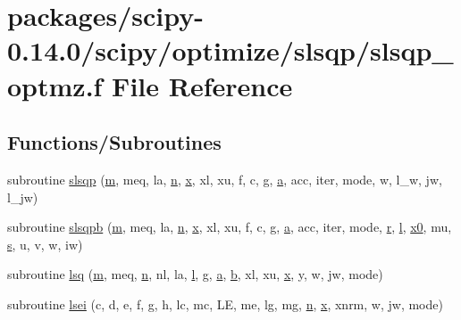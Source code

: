 \hypertarget{slsqp__optmz_8f}{}\section{packages/scipy-\/0.14.0/scipy/optimize/slsqp/slsqp\+\_\+optmz.f File Reference}
\label{slsqp__optmz_8f}
\subsection*{Functions/\+Subroutines}
\begin{DoxyCompactItemize}
\item 
subroutine \hyperlink{slsqp__optmz_8f_ae44ee94d395c85643dfb0fc1f1ebd694}{slsqp} (\hyperlink{indexexpr_8h_ab72fdb4031d47b75ab26dd18a437bcdc}{m}, meq, la, \hyperlink{indexexpr_8h_ab427e2e2b4d6cec55fa088ea2a692ace}{n}, \hyperlink{vecnorm1_8cc_ac73eed9e41ec09d58f112f06c2d6cb63}{x}, xl, xu, f, c, g, \hyperlink{gen__mat5files_8m_aae328bf20413f220e38aec4d95bfd6da}{a}, acc, iter, mode, w, l\+\_\+w, jw, l\+\_\+jw)
\item 
subroutine \hyperlink{slsqp__optmz_8f_a79e4c04aa2c95e82f34187b5bc3d0123}{slsqpb} (\hyperlink{indexexpr_8h_ab72fdb4031d47b75ab26dd18a437bcdc}{m}, meq, la, \hyperlink{indexexpr_8h_ab427e2e2b4d6cec55fa088ea2a692ace}{n}, \hyperlink{vecnorm1_8cc_ac73eed9e41ec09d58f112f06c2d6cb63}{x}, xl, xu, f, c, g, \hyperlink{gen__mat5files_8m_aae328bf20413f220e38aec4d95bfd6da}{a}, acc, iter, mode, \hyperlink{indexexpr_8h_ac434fd11cc2493608d8d91424d60c17e}{r}, \hyperlink{indexexpr_8h_a88aacdaa46b76729743ee33ef8b95a58}{l}, \hyperlink{gendata_8m_aa48da42c617fdb7cf84e9a3f80aa04e8}{x0}, mu, \hyperlink{indexexpr_8h_ae024b0db549122b44c349ae28ec990dc}{s}, u, v, w, iw)
\item 
subroutine \hyperlink{slsqp__optmz_8f_a6535ab407a5944d85a8ab5c976ee1aea}{lsq} (\hyperlink{indexexpr_8h_ab72fdb4031d47b75ab26dd18a437bcdc}{m}, meq, \hyperlink{indexexpr_8h_ab427e2e2b4d6cec55fa088ea2a692ace}{n}, nl, la, \hyperlink{indexexpr_8h_a88aacdaa46b76729743ee33ef8b95a58}{l}, g, \hyperlink{gen__mat5files_8m_aae328bf20413f220e38aec4d95bfd6da}{a}, \hyperlink{gen__mat5files_8m_a7b38767b3b6a8dae167e5afa4fc340b0}{b}, xl, xu, \hyperlink{vecnorm1_8cc_ac73eed9e41ec09d58f112f06c2d6cb63}{x}, y, w, jw, mode)
\item 
subroutine \hyperlink{slsqp__optmz_8f_a213cdb47cf9975174265038c3dd80bc0}{lsei} (c, d, e, f, g, h, lc, mc, L\+E, me, lg, mg, \hyperlink{indexexpr_8h_ab427e2e2b4d6cec55fa088ea2a692ace}{n}, \hyperlink{vecnorm1_8cc_ac73eed9e41ec09d58f112f06c2d6cb63}{x}, xnrm, w, jw, mode)

\end{DoxyCompactItemize}
